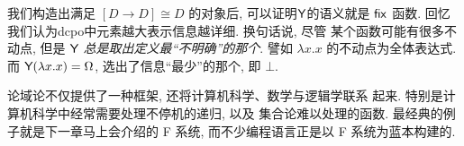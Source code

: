 我们构造出满足 \([D \to D] \cong D\) 的对象后,
可以证明\(\textsf{Y}\)的语义就是 \(\textsf{fix}\) 函数.
回忆我们认为dcpo中元素越大表示信息越详细.
换句话说, 尽管
某个函数可能有很多不动点, 但是 \(\textsf{Y}\)
\emph{总是取出定义最“不明确”的那个}. 譬如 \(\lambda x.x\)
的不动点为全体表达式. 而 \(\textsf{Y}(\lambda x. x) = \Omega\),
选出了信息“最少”的那个, 即 \(\bot\).

论域论不仅提供了一种框架, 还将计算机科学、数学与逻辑学联系
起来. 特别是计算机科学中经常需要处理不停机的递归, 以及
集合论难以处理的函数. 最经典的例子就是下一章马上会介绍的
F 系统, 而不少编程语言正是以 F 系统为蓝本构建的.
